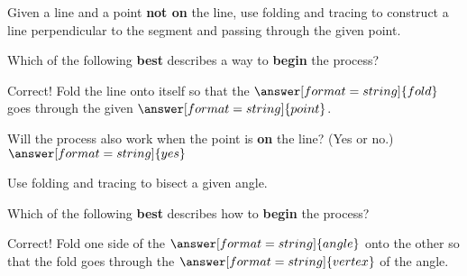\documentclass[nooutcomes]{ximera}
\begin{document}
\begin{problem}
Given a line and a point \textbf{not on} the line, use folding and tracing to construct a line perpendicular to the segment and passing through the given point. 
\begin{image}
\end{image}
Which of the following \textbf{best} describes a way to \textbf{begin} the process?  
\begin{multipleChoice}
\end{multipleChoice}
\begin{problem}
Correct!  Fold the line onto itself so that the $\answer[format=string]{fold}$ goes through the given $\answer[format=string]{point}$.

Will the process also work when the point is \textbf{on} the line?  (Yes or no.) $\answer[format=string]{yes}$
\end{problem}
\end{problem}


\begin{problem}
Use folding and tracing to bisect a given angle.
\begin{image}
\end{image}
Which of the following \textbf{best} describes how to \textbf{begin} the process?  
\begin{multipleChoice}
\end{multipleChoice}
\begin{problem}
Correct!  Fold one side of the $\answer[format=string]{angle}$ onto the other so that the fold goes through the $\answer[format=string]{vertex}$ of the angle. 
\end{problem}
\end{problem}
\end{document}

